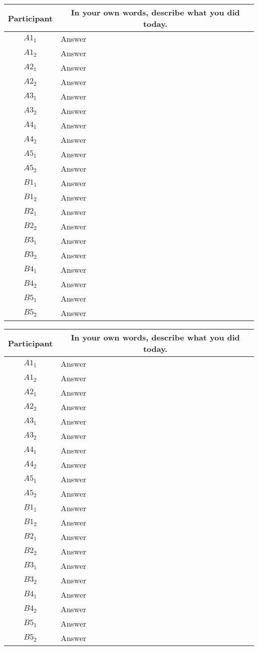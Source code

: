 \noindent
\begin{tabularx}{\linewidth}{@{}cX@{}}
  \toprule
  Participant & \multicolumn{1}{c}{
    \textbf{In your own words, describe what you did today.}
  } \\ \midrule
  $A1_{1}$ & Answer \\
  $A1_{2}$ & Answer \\
  $A2_{1}$ & Answer \\
  $A2_{2}$ & Answer \\
  $A3_{1}$ & Answer \\
  $A3_{2}$ & Answer \\
  $A4_{1}$ & Answer \\
  $A4_{2}$ & Answer \\
  $A5_{1}$ & Answer \\
  $A5_{2}$ & Answer \\
  \midrule
  $B1_{1}$ & Answer \\
  $B1_{2}$ & Answer \\
  $B2_{1}$ & Answer \\
  $B2_{2}$ & Answer \\
  $B3_{1}$ & Answer \\
  $B3_{2}$ & Answer \\
  $B4_{1}$ & Answer \\
  $B4_{2}$ & Answer \\
  $B5_{1}$ & Answer \\
  $B5_{2}$ & Answer \\
  \bottomrule
\end{tabularx}{\parfillskip=0pt\par}
\noindent
\begin{tabularx}{\linewidth}{@{}cX@{}}
  \toprule
  Participant & \multicolumn{1}{c}{
    \textbf{In your own words, describe what you did today.}
  } \\ \midrule
  $A1_{1}$ & Answer \\
  $A1_{2}$ & Answer \\
  $A2_{1}$ & Answer \\
  $A2_{2}$ & Answer \\
  $A3_{1}$ & Answer \\
  $A3_{2}$ & Answer \\
  $A4_{1}$ & Answer \\
  $A4_{2}$ & Answer \\
  $A5_{1}$ & Answer \\
  $A5_{2}$ & Answer \\
  \midrule
  $B1_{1}$ & Answer \\
  $B1_{2}$ & Answer \\
  $B2_{1}$ & Answer \\
  $B2_{2}$ & Answer \\
  $B3_{1}$ & Answer \\
  $B3_{2}$ & Answer \\
  $B4_{1}$ & Answer \\
  $B4_{2}$ & Answer \\
  $B5_{1}$ & Answer \\
  $B5_{2}$ & Answer \\
  \bottomrule
\end{tabularx}{\parfillskip=0pt\par}

